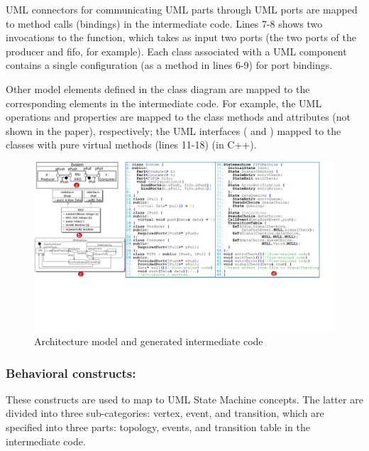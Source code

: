 UML connectors for communicating UML parts through UML ports are mapped to method calls (bindings) in the intermediate code.
Lines 7-8 shows two invocations to the  function, which takes as input two ports (the two ports of the producer and fifo, for example).
Each class associated with a UML component contains a single configuration (as a method in lines 6-9) for port bindings.

Other model elements defined in the class diagram are mapped to the corresponding elements in the intermediate code.
For example, the UML operations and properties are mapped to the class methods and attributes (not shown in the paper), respectively; the UML interfaces ( and ) mapped to the classes with pure virtual methods (lines 11-18) (in C++). 

  

\begin{figure}
	\centering
	\includegraphics[clip, trim=0cm 5.9cm 1.6cm 0cm, width=\textwidth]{figures/approachexample.pdf}
	\caption{Architecture model and generated intermediate code} 
	\label{fig:approachexample}
\end{figure}


\subsubsection{Behavioral constructs:}
These constructs are used to map to UML State Machine concepts.
The latter are divided into three sub-categories: vertex, event, and transition, which are specified into three parts: topology, events, and transition table in the intermediate code.


